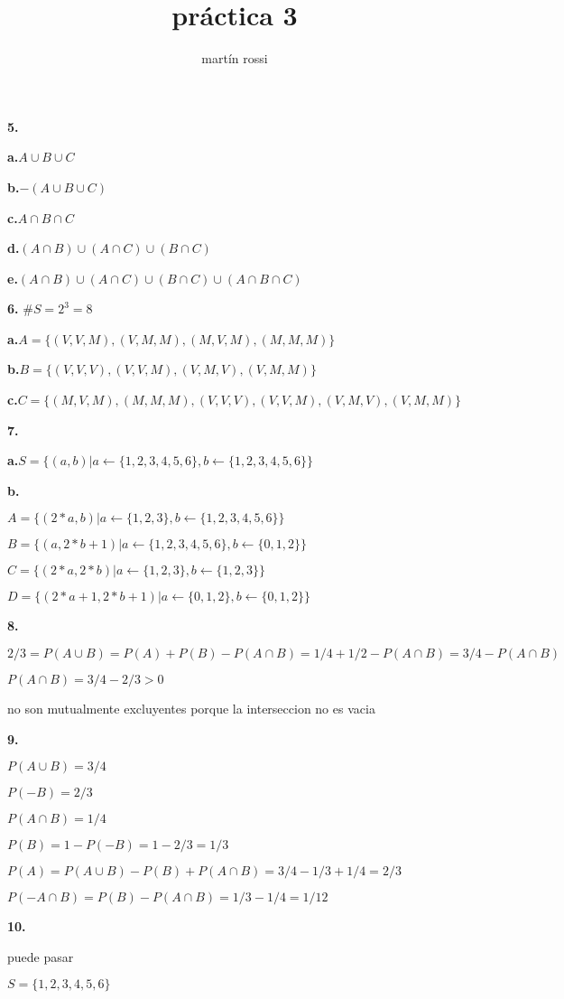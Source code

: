 \documentclass[12pt]{article}
\title{práctica 3}
\author{martín rossi}
\date{}
\begin{document}
\maketitle
\textbf{5.}

\textbf{a.}$A \cup B \cup C$

\textbf{b.}$-(A \cup B \cup C)$

\textbf{c.}$A \cap B \cap C$

\textbf{d.}$(A \cap B) \cup (A \cap C) \cup (B \cap C)$

\textbf{e.}$(A \cap B) \cup (A \cap C) \cup (B \cap C) \cup (A \cap B \cap C)$

\textbf{6.}
$\#S=2^3=8$

\textbf{a.}$A=\{(V,V,M),(V,M,M),(M,V,M),(M,M,M)\}$

\textbf{b.}$B=\{(V,V,V),(V,V,M),(V,M,V),(V,M,M)\}$

\textbf{c.}$C=\{(M,V,M),(M,M,M),(V,V,V),(V,V,M),(V,M,V),(V,M,M)\}$

\textbf{7.}

\textbf{a.}$S=\{(a,b)|a\leftarrow\{1,2,3,4,5,6\},b\leftarrow\{1,2,3,4,5,6\}\}$

\textbf{b.}

$A=\{(2*a,b)|a\leftarrow\{1,2,3\},b\leftarrow\{1,2,3,4,5,6\}\}$

$B=\{(a,2*b+1)|a\leftarrow\{1,2,3,4,5,6\},b\leftarrow\{0,1,2\}\}$

$C=\{(2*a,2*b)|a\leftarrow\{1,2,3\},b\leftarrow\{1,2,3\}\}$

$D=\{(2*a+1,2*b+1)|a\leftarrow\{0,1,2\},b\leftarrow\{0,1,2\}\}$
  
\textbf{8.}

$2/3=P(A \cup B)=P(A)+P(B)-P(A \cap B)=1/4+1/2-P(A \cap B)=3/4-P(A \cap B)$

$P(A \cap B)=3/4-2/3>0$

no son mutualmente excluyentes porque la interseccion no es vacia

\textbf{9.}

$P(A \cup B)=3/4$

$P(-B)=2/3$

$P(A \cap B)=1/4$

$P(B)=1-P(-B)=1-2/3=1/3$

$P(A)=P(A \cup B)-P(B)+P(A \cap B)=3/4-1/3+1/4=2/3$

$P(-A \cap B)=P(B)-P(A \cap B)=1/3-1/4=1/12$

\textbf{10.}

puede pasar

$S=\{1,2,3,4,5,6\}$
\end{document}
